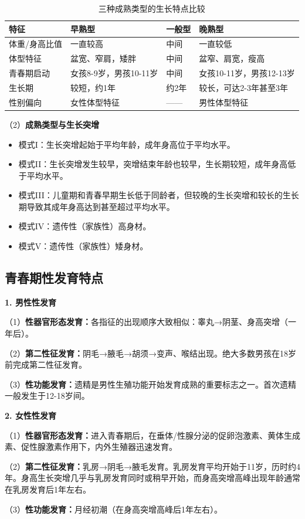 \begin{keybox}
\begin{table}[H]
\centering
\caption{三种成熟类型的生长特点比较}
\begin{tabularx}{\textwidth}{l>{\raggedright\arraybackslash}p{4cm}>{\raggedright\arraybackslash}p{4cm}>{\raggedright\arraybackslash}p{4cm}}
\hline
\textbf{特征} & \textbf{早熟型} & \textbf{一般型} & \textbf{晚熟型} \\
\hline
体重/身高比值 & 一直较高 & 中间 & 一直较低 \\
\hline
体型特征 & 盆宽、窄肩，矮胖 & 中间 & 盆窄、肩宽，瘦高 \\
\hline
青春期启动 & 女孩8-9岁，男孩10-11岁 & 中间 & 女孩10-11岁，男孩12-13岁 \\
\hline
生长期 & 较短，约1年 & 约2年 & 较长，可达2-3年甚至3年 \\
\hline
性别偏向 & 女性体型特征 & —— & 男性体型特征 \\
\hline
\end{tabularx}
\end{table}

（2）\textbf{成熟类型与生长突增}
\begin{itemize}
    \item 模式I：生长突增起始于平均年龄，成年身高位于平均水平。
    \item 模式II：生长突增发生较早，突增结束年龄也较早，生长期较短，成年身高低于平均水平。
    \item 模式III：儿童期和青春早期生长低于同龄者，但较晚的生长突增和较长的生长期导致其成年身高达到甚至超过平均水平。
    \item 模式IV：遗传性（家族性）高身材。
    \item 模式V：遗传性（家族性）矮身材。
\end{itemize}
\end{keybox}

\subsection{青春期性发育特点}

\begin{keybox}
\textbf{1. 男性性发育}

（1）\textbf{性器官形态发育：}各指征的出现顺序大致相似：睾丸→阴茎、身高突增（一年后）。

（2）\textbf{第二性征发育：}阴毛→腋毛→胡须→变声、喉结出现。绝大多数男孩在18岁前完成第二性征发育。

（3）\textbf{性功能发育：}遗精是男性生殖功能开始发育成熟的重要标志之一。首次遗精一般发生于12-18岁间。

\textbf{2. 女性性发育}

（1）\textbf{性器官形态发育：}进入青春期后，在垂体/性腺分泌的促卵泡激素、黄体生成素、促性腺激素作用下，内外生殖器迅速发育。

（2）\textbf{第二性征发育：}乳房→阴毛→腋毛发育。乳房发育平均开始于11岁，历时约4年。身高生长突增几乎与乳房发育同时或稍早开始，而身高突增高峰出现年龄通常在乳房发育后1年左右。

（3）\textbf{性功能发育：}月经初潮（在身高突增高峰后1年左右）。
\end{keybox}

